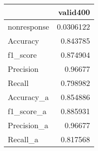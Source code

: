 \begin{tabular}{lr}
\hline
             &     valid400 \\
\hline
 nonresponse & 0.0306122 \\
 Accuracy    & 0.843785  \\
 f1_score    & 0.874904  \\
 Precision   & 0.96677   \\
 Recall      & 0.798982  \\
 Accuracy_a  & 0.854886  \\
 f1_score_a  & 0.885931  \\
 Precision_a & 0.96677   \\
 Recall_a    & 0.817568  \\
\hline
\end{tabular}
